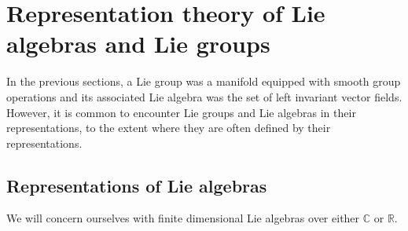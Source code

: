 \section{Representation theory of Lie algebras and Lie groups}
In the previous sections, a Lie group was a manifold equipped with smooth group operations and its associated Lie algebra was the set of left invariant vector fields. However, it is common to encounter Lie groups and Lie algebras in their representations, to the extent where they are often defined by their representations.

\subsection{Representations of Lie algebras}
We will concern ourselves with finite dimensional Lie algebras over either \(\mathbb{C}\) or \(\mathbb{R}.\)

